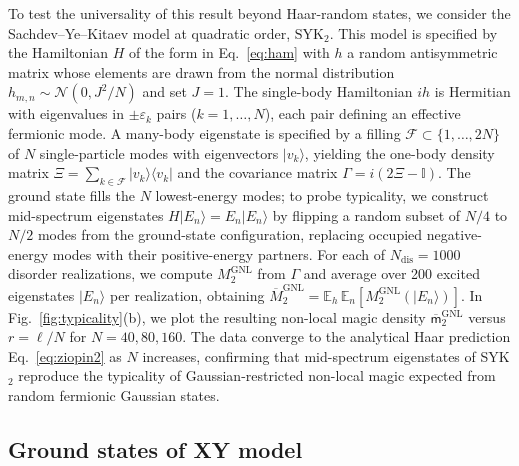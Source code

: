 \documentclass[prx,twocolumn,superscriptaddress,aps,10pt, frontmatterverbose, reprint,footinbib,longbibliography=true]{revtex4-2}
\begin{document}
To test the universality of this result beyond Haar-random states, we consider the Sachdev--Ye--Kitaev model at quadratic order, $\mathrm{SYK}_2$.
This model is specified by the  Hamiltonian  $H$ of the form in  Eq.~\eqref{eq:ham} with  $h$ a random antisymmetric matrix whose elements are drawn from the normal distribution $h_{m,n}\sim \mathcal{N}(0,{J^2}/{N})$ and set $J=1$. 
The single-body Hamiltonian $ih$ is Hermitian with eigenvalues in $\pm\varepsilon_k$ pairs ($k=1,\dots,N$), each pair defining an effective fermionic mode. A many-body eigenstate is specified by a filling $\mathcal{F}\subset\{1,\dots,2N\}$ of $N$ single-particle modes with eigenvectors $|v_k\rangle$, yielding the one-body density matrix $\Xi=\sum_{k\in\mathcal{F}}|v_k\rangle\langle v_k|$ and the covariance matrix $\Gamma = i(2\Xi-\mathbb{I})$. 
The ground state fills the $N$ lowest-energy modes; to probe typicality, we construct mid-spectrum eigenstates $H|E_n\rangle=E_n|E_n\rangle$  by flipping a random subset of $N/4$ to $N/2$ modes from the ground-state configuration, replacing occupied negative-energy modes with their positive-energy partners. For each of $N_{\mathrm{dis}}=1000$ disorder realizations, we compute $M_2^{\mathrm{GNL}}$ from $\Gamma$ and average over 200 excited eigenstates $|E_n\rangle$ per realization, obtaining $\overline{M}_2^{\mathrm{GNL}}=\mathbb{E}_{h}\,\mathbb{E}_{n}[M_2^{\mathrm{GNL}}(|E_n\rangle)]$.
In Fig.~\ref{fig:typicality}(b), we plot the resulting non-local magic density $\overline{\mathsf{m}}_2^\mathrm{GNL}$ versus $r=\ell/N$ for $N=40,80,160$.
The data converge to the analytical Haar prediction Eq.~\eqref{eq:ziopin2} as $N$ increases, confirming that mid-spectrum eigenstates of SYK$_2$ reproduce the typicality of Gaussian-restricted non-local magic expected from random fermionic Gaussian states.



\subsection{Ground states of XY model}
\end{document}
